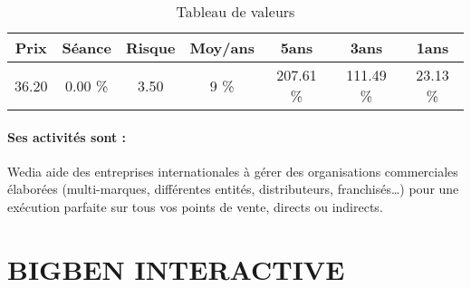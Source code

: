 \documentclass[11pt,a4paper]{report}%
\begin{document}
\begin{table}[H]
  \centering
    \begin{tabular}{|c|c|c|c|c|c|c|}
    \hline
    Prix & Séance & Risque  & Moy/ans & 5ans & 3ans & 1ans \\
    \hline
    36.20 &    0.00 \%    & 3.50 & 9 \% & 207.61 \% & 111.49 \% & 23.13 \% \\
    \hline
    \end{tabular}%
        \label{tab:table_WEDIA}%
      \caption{Tableau de valeurs}
\end{table}%

\paragraph{Ses activités sont : } Wedia aide des entreprises internationales à gérer des organisations commerciales élaborées (multi-marques, différentes entités, distributeurs, franchisés…) pour une exécution parfaite sur tous vos points de vente, directs ou indirects. 
    
    \newpage

\section{BIGBEN INTERACTIVE}
\end{document}
